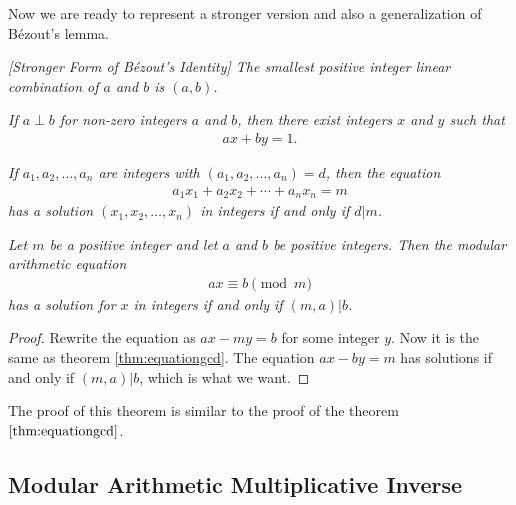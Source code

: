 \documentclass{subfile}
\begin{document}
	Now we are ready to represent a stronger version and also a generalization of B\'{e}zout's lemma.
	
	\begin{corollary} \slshape  [Stronger Form of B\'{e}zout's Identity]
		The smallest positive integer linear combination of $a$ and $b$ is $(a,b)$.
	\end{corollary}
	
	\begin{corollary} \slshape \label{cor:bezoutcoprime}
		If $a \perp b$ for non-zero integers $a$ and $b$, then there exist integers $x$ and $y$ such that
		\begin{align*}
		ax+by=1.
		\end{align*}
	\end{corollary}
	
	\begin{theorem}  \slshape 
		If $a_1, a_2, \ldots, a_n$ are integers with $(a_1, a_2, \ldots, a_n)=d$, then the equation
		\begin{align*}
		a_1x_1 + a_2x_2 + \cdots + a_n x_n = m
		\end{align*}
		has a solution $(x_1, x_2, \ldots, x_n)$ in integers if and only if $d|m$.
	\end{theorem}
	
	\begin{theorem}\slshape
		Let $m$ be a positive integer and let $a$ and $b$ be positive integers. Then the modular arithmetic equation
		\begin{align*} ax \equiv b \pmod m\end{align*}
		has a solution for $x$ in integers if and only if $(m,a)|b$.
	\end{theorem}
	
	\begin{proof}
		Rewrite the equation as $ax-my = b$ for some integer $y$. Now it is the same as theorem \eqref{thm:equationgcd}. The equation $ax-by=m$ has solutions if and only if $(m,a)|b$, which is what we want.
		
	\end{proof}
	
	
	
	The proof of this theorem is similar to the proof of the theorem $\eqref{thm:equationgcd}$.
	
	\subsection{Modular Arithmetic Multiplicative Inverse}
	
\end{document}
